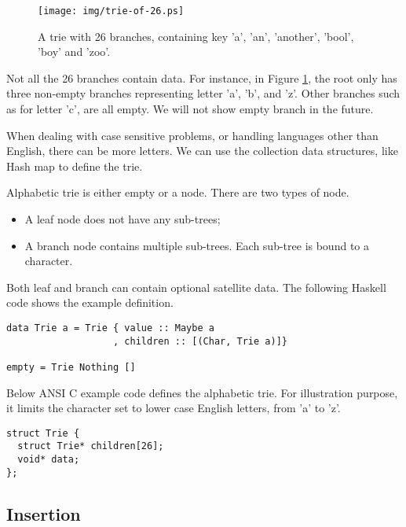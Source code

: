 \documentclass[b5paper]{article}
\begin{document}
\begin{figure}[htbp]
  \centering
  \texttt{[image: img/trie-of-26.ps]}
  \caption{A trie with 26 branches, containing key 'a', 'an', 'another', 'bool',
    'boy' and 'zoo'.}
  \label{fig:trie-of-26}
\end{figure}

Not all the 26 branches contain data. For instance, in Figure \ref{fig:trie-of-26},
the root only has three non-empty branches representing letter 'a',
'b', and 'z'. Other branches such as for letter 'c', are all
empty. We will not show empty branch in the future.

When dealing with case sensitive problems, or handling languages other than English,
there can be more letters. We can use the collection data structures, like Hash map
to define the trie.

Alphabetic trie is either empty or a node. There are two types of node.

\begin{itemize}
\item A leaf node does not have any sub-trees;
\item A branch node contains multiple sub-trees. Each sub-tree is bound to a character.
\end{itemize}

Both leaf and branch can contain optional satellite data. The following Haskell
code shows the example definition.

\lstset{language=Haskell}
\begin{lstlisting}
data Trie a = Trie { value :: Maybe a
                   , children :: [(Char, Trie a)]}

empty = Trie Nothing []
\end{lstlisting}

Below ANSI C example code defines the alphabetic trie. For illustration purpose,
it limits the character set to lower case English letters, from 'a' to 'z'.

\lstset{language=C}
\begin{lstlisting}
struct Trie {
  struct Trie* children[26];
  void* data;
};
\end{lstlisting}


\subsection{Insertion}
\end{document}
